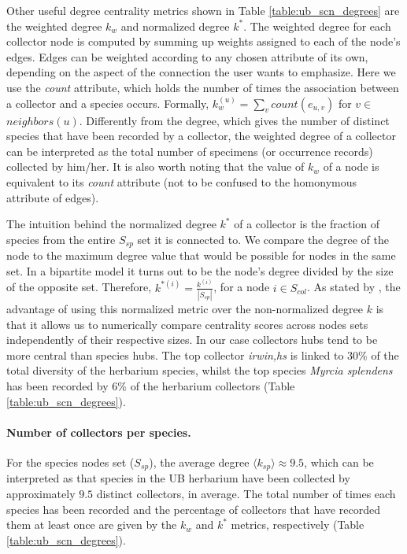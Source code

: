 Other useful degree centrality metrics shown in Table \ref{table:ub_scn_degrees} are the weighted degree $k_w$ and normalized degree $k^*$. The weighted degree for each collector node is computed by summing up weights assigned to each of the node's edges. Edges can be weighted according to any chosen attribute of its own, depending on the aspect of the connection the user wants to emphasize. Here we use the \textit{count} attribute, which holds the number of times the association between a collector and a species occurs. Formally, $k_w^{(u)} = \sum_{v} count(e_{u,v})$ for $v \in$ $neighbors(u)$. Differently from the degree, which gives the number of distinct species that have been recorded by a collector, the weighted degree of a collector can be interpreted as the total number of specimens (or occurrence records) collected by him/her. It is also worth noting that the value of $k_w$ of a node is equivalent to its \textit{count} attribute (not to be confused to the homonymous attribute of edges).

The intuition behind the normalized degree $k^*$ of a collector is the fraction of species from the entire $S_{sp}$ set it is connected to. We compare the degree of the node to the maximum degree value that would be possible for nodes in the same set. In a bipartite model it turns out to be the node's degree divided by the size of the opposite set. Therefore, $k^{*(i)} = \frac{k^{(i)}}{|S_{sp}|}$, for a node $i \in S_{col}$. 
As stated by , the advantage of using this normalized metric over the non-normalized degree $k$ is that it allows us to numerically compare centrality scores across nodes sets independently of their respective sizes. 
In our case collectors hubs tend to be more central than species hubs. The top collector \textit{irwin,hs} is linked to $30\%$ of the total diversity of the herbarium species, whilst the top species \textit{Myrcia splendens} has been recorded by $6\%$ of the herbarium collectors (Table \ref{table:ub_scn_degrees}). 



\paragraph{Number of collectors per species.}
For the species nodes set ($S_{sp}$), the average degree $\langle k_{sp}\rangle \approx 9.5$, which can be interpreted as that species in the UB herbarium have been collected by approximately $9.5$ distinct collectors, in average. 
The total number of times each species has been recorded and the percentage of collectors that have recorded them at least once are given by the $k_w$ and $k^*$ metrics, respectively (Table \ref{table:ub_scn_degrees}).

